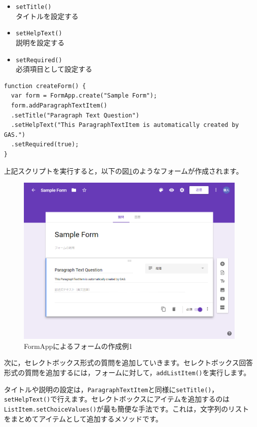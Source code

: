 \documentclass[uplatex,a4j]{jsarticle}
\begin{document}
\begin{itemize}
\item \verb|setTitle()|\\
タイトルを設定する
\item \verb|setHelpText()|\\
説明を設定する
\item \verb|setRequired()|\\
必須項目として設定する
\end{itemize}

\begin{lstlisting}[basicstyle=\ttfamily\footnotesize,frame=single,caption=FormApp sample 4]
function createForm() {
  var form = FormApp.create("Sample Form");
  form.addParagraphTextItem()
  .setTitle("Paragraph Text Question")
  .setHelpText("This ParagraphTextItem is automatically created by GAS.")
  .setRequired(true);
}
\end{lstlisting}

上記スクリプトを実行すると，以下の図\ref{fig:form_sample1}のようなフォームが作成されます。

\begin{figure}[H]
 \centering
 \includegraphics[keepaspectratio, scale=0.5]{images/form_sample1.png}
 \caption{FormAppによるフォームの作成例1}
 \label{fig:form_sample1}
\end{figure}

次に，セレクトボックス形式の質問を追加していきます。セレクトボックス回答形式の質問を追加するには，フォームに対して，\verb|addListItem()|を実行します。


タイトルや説明の設定は，\verb|ParagraphTextItem|と同様に\verb|setTitle()|，\verb|setHelpText()|で行えます。セレクトボックスにアイテムを追加するのは\verb|ListItem.setChoiceValues()|が最も簡便な手法です。これは，文字列のリストをまとめてアイテムとして追加するメソッドです。
\end{document}
